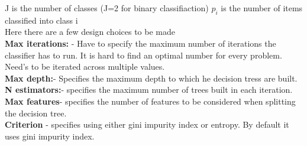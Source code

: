 \documentclass[sigconf]{acmart}
\begin{document}
J is the number of classes (J=2 for binary classifiaction)
$p_i$ is the number of items classified into class i\\
Here there are a few design choices to be made\\
\textbf{Max iterations:} - Have to specify the maximum number of iterations the classifier has to run. It is hard to find an optimal number for every problem. Need's to be iterated across multiple values. \\
\textbf{Max depth:}- Specifies the maximum depth to which he decision tress are built.\\
\textbf{N estimators:}- specifies the maximum number of trees built in each iteration.\\
\textbf{Max features}- specifies the number of features to be considered when splitting the decision tree.\\
\textbf{Criterion} - specifies using either gini impurity index or entropy. By default it uses gini impurity index.\cite{Breiman2010}
\end{document}
